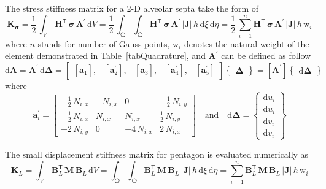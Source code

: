 The stress stiffness matrix for a 2-D alveolar septa take the form of
\begin{equation}
\mathbf{K}_{\boldsymbol{\sigma}} = \frac{1}{2} \, \int_{V} \, \mathbf{H}^{\mathsf{T}} \, \boldsymbol{\sigma} \, \mathbf{A}^{'} \, \mathrm{d} V
= \frac{1}{2} \, \int_{\pentagon} \int_{\pentagon} \mathbf{H}^{\mathsf{T}} \, \boldsymbol{\sigma} \, \mathbf{A}^{'} \, |\mathbf{J}|  \, h \,  \mathrm{d} \xi \,  \mathrm{d} \eta =  \frac{1}{2} \, \sum_{i=1}^{n}  \mathbf{H}^{\mathsf{T}} \, \boldsymbol{\sigma} \, \mathbf{A}^{'} \, |\mathbf{J}| \, h \, \mathrm{w}_i
\end{equation}
where $n$ stands for number of Gauss points, $\mathrm{w}_i$ denotes the natural weight of the element demonstrated in Table~\ref{tabQuadrature}, and $\mathbf{A}^{'}$ can be defined as follow
\begin{equation}
\mathrm{d} \mathbf{A} = \mathbf{A}^{'} \, \mathrm{d} \boldsymbol{\Delta} = \begin{bmatrix}
[\mathbf{a}^{'}_1], & [\mathbf{a}^{'}_2], & [\mathbf{a}^{'}_3], & [\mathbf{a}^{'}_4], & [\mathbf{a}^{'}_5] 
\end{bmatrix}  \begin{Bmatrix} \boldsymbol{\Delta} \end{Bmatrix}  
= [\mathbf{A}^{'}] \begin{Bmatrix} \mathrm{d} \boldsymbol{\Delta} \end{Bmatrix}
\end{equation}
where
\begin{equation}
\mathbf{a}^{'}_i = \begin{bmatrix}
-\tfrac{1}{2} \, N_{i,x} &  - N_{i,x} & 0 & -\tfrac{1}{2} \, N_{i,y} \\
-\tfrac{1}{2} \, N_{i,x} &  N_{i,x} &  N_{i,x} &  \tfrac{1}{2} \, N_{i,y} \\
-2 \, N_{i,y} & 0 & -4 \, N_{i,x} & 2 \, N_{i,x} \end{bmatrix} \quad \text{and} \quad  \mathrm{d} \boldsymbol{\Delta} = \begin{Bmatrix}
\mathrm{d} u_i\\
\mathrm{d} u_i\\
\mathrm{d} v_i\\
\mathrm{d} v_i
\end{Bmatrix}
\end{equation}

The small displacement stiffness matrix for pentagon is evaluated numerically as 
\begin{equation}
\mathbf{K}_{L} = \int_{V} \, \mathbf{B}_L^{\mathsf{T}} \, \mathbf{M} \, \mathbf{B}_L \, \mathrm{d} V  = \int_{\pentagon} \int_{\pentagon} \mathbf{B}_L^{\mathsf{T}} \, \mathbf{M} \, \mathbf{B}_L \, |\mathbf{J}| \, h \,  \mathrm{d} \xi \,  \mathrm{d} \eta =  \sum_{i=1}^{n}  \mathbf{B}_L^{\mathsf{T}} \, \mathbf{M} \, \mathbf{B}_L \, |\mathbf{J}|  \, h \, \mathrm{w}_i
\end{equation}

